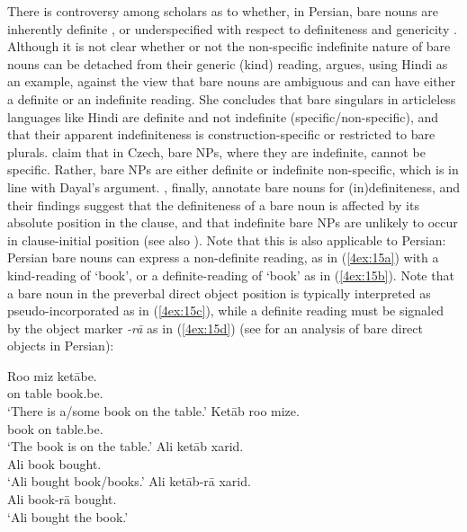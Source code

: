 \documentclass[output=paper]{langsci/langscibook}
\begin{document}
{
There is controversy among scholars as to whether, in Persian, bare nouns are inherently definite \citep{krifka:modarresi:16}, or underspecified with respect to definiteness and genericity \citep{ghomeshi:03}. Although it is not clear whether or not the non-specific indefinite nature of bare nouns can be detached from their generic (kind) reading, \cite{dayal:17} argues, using Hindi as an example, against the view that bare nouns are ambiguous and can have either a definite or an indefinite reading. She concludes that bare singulars in articleless languages like Hindi are definite and not indefinite (specific/non-specific), and that their apparent indefiniteness is construction-specific or restricted to bare plurals. \cite{simik:burianova:18} claim that in Czech, bare NPs, where they are indefinite, cannot be specific. Rather, bare NPs are either definite or indefinite non-specific, which is in line with Dayal's argument. \cite{simik:burianova:18}, finally, annotate bare nouns for (in)definiteness, and their findings suggest that the definiteness of a bare noun is affected by its absolute position in the clause, and that indefinite bare NPs are unlikely to occur in clause-initial position (see also ). Note that this is also applicable to Persian: Persian bare nouns can express a non-definite reading, as in (\ref{4ex:15a}) with a kind-reading of `book', or a definite-reading of `book' as in (\ref{4ex:15b}). Note that a bare noun in the preverbal direct object position is typically interpreted as pseudo-incorporated \citep[in the sense of][]{massam:01} as in (\ref{4ex:15c}), while a definite reading must be signaled by the object marker {\emph{-rā}} as in (\ref{4ex:15d}) (see \citealt{modarresi:14} for an analysis of bare direct objects in Persian):
}

\begin{exe}
\ex\label{4ex:15}
	\begin{xlista}
	\ex\label{4ex:15a}
	\gll	Roo  	miz  		ketābe. \\
 	 	on 		table 	book.be.{} \\
	\glt 	`There is a/some book on the table.'
	\ex\label{4ex:15b}
        \gll	Ketāb 	roo 	mize. \\
 	 	book 	on 	table.be.{} \\
 	\glt 	`The book is on the table.'
	\ex\label{4ex:15c}
	\gll 	Ali	ketāb	xarid. \\
		Ali	book		bought.{} \\
	\glt	`Ali bought book/books.'
	\ex\label{4ex:15d}
	\gll	Ali	ketāb-rā	xarid. \\
		Ali	book-rā	bought.{} \\
	\glt	`Ali bought the book.'
	\end{xlista}
\end{exe}
\end{document}
